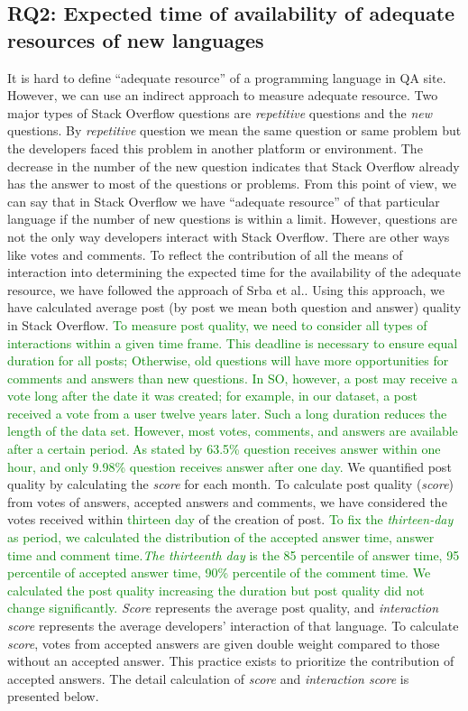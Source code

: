 \subsection{RQ2: Expected time of availability of adequate resources of new languages}
\label{RQ2}

It is hard to define ``adequate resource'' of a programming language in QA site. However, we can use an indirect approach to measure adequate resource. Two major types of Stack Overflow questions are \emph{repetitive} questions and the \emph{new} questions. By \emph{repetitive} question we mean the same question or same problem but the developers \citep{TausczikWC17} faced this problem in another platform or environment. The decrease in the number of the new question indicates that Stack Overflow already has the answer to most of the questions or problems. From this point of view, we can say that in Stack Overflow we have ``adequate resource'' of that particular language if the number of new questions is within a limit. However,  questions are not the only way developers interact with Stack Overflow.
There are other ways like votes and comments. To reflect the contribution of all the means of interaction into determining the expected time for the availability of the adequate resource, we have followed the approach of Srba et al.\citep{Srba2016}. Using this approach, we have calculated average post (by post we mean both question and answer) quality in Stack Overflow. \textcolor{green}{To measure post quality, we need to consider all types of interactions within a given time frame. This deadline is necessary to ensure equal duration for all posts; Otherwise, old questions will have more opportunities for comments and answers than new questions. In SO, however, a post may receive a vote long after the date it was created; for example, in our dataset, a post received a vote from a user twelve years later. Such a long duration reduces the length of the data set. However, most votes, comments, and answers are available after a certain period. As stated by \citep{Bhat2014} 63.5\% question receives answer within one hour, and only 9.98\% question receives answer after one day.} We quantified post quality by calculating the \emph{score} for each month. To calculate post quality (\emph{score}) from votes of answers, accepted answers and comments, we have considered the votes received within \textcolor{green}{thirteen day} of the creation of post. \textcolor{green}{To fix the \emph{thirteen-day} as period, we calculated the distribution of the accepted answer time, answer time and comment time.\emph{The thirteenth day} is the 85 percentile of answer time, 95 percentile of accepted answer time, 90\% percentile of the comment time. We calculated the post quality increasing the duration but post quality did not change significantly.} \emph{Score} represents the average post quality, and \emph{interaction score} represents the average developers' interaction of that language. To calculate \emph{score}, votes from accepted answers are given double weight compared to those without an accepted answer. This practice exists\citep{Romano2013}  to prioritize the  contribution of accepted answers. The detail calculation of \emph{score} and \emph{interaction score} is presented below.

